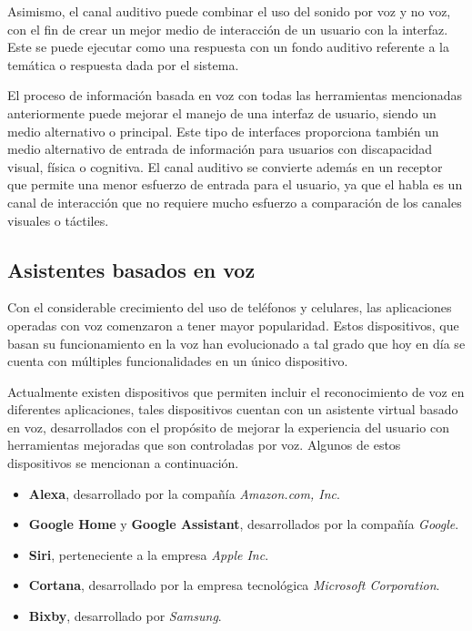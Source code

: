 Asimismo, el canal auditivo puede combinar el uso del sonido por voz y no voz, con el fin de crear un mejor medio de interacción de un usuario con la interfaz. Este se puede ejecutar como una respuesta con un fondo auditivo referente a la temática o respuesta dada por el sistema.

El proceso de información basada en voz con todas las herramientas mencionadas anteriormente puede mejorar el manejo de una interfaz de usuario, siendo un medio alternativo o principal. Este tipo de interfaces proporciona también un medio alternativo de entrada de información para usuarios con discapacidad visual, física o cognitiva. El canal auditivo se convierte además en un receptor que permite una menor esfuerzo de entrada para el usuario, ya que el habla es un canal de interacción que no requiere mucho esfuerzo a comparación de los canales visuales o táctiles.


\subsection{Asistentes basados en voz}
\label{AsistentesBasadosVozCap3}

Con el considerable crecimiento del uso de teléfonos y celulares, las aplicaciones operadas con voz comenzaron a tener mayor popularidad. Estos dispositivos, que basan su funcionamiento en la voz han evolucionado a tal grado que hoy en día se cuenta con múltiples funcionalidades en un único dispositivo.

Actualmente existen dispositivos que permiten incluir el reconocimiento de voz en diferentes aplicaciones, tales dispositivos cuentan con un asistente virtual basado en voz, desarrollados con el propósito de mejorar la experiencia del usuario con herramientas mejoradas que son controladas por voz. Algunos de estos dispositivos se mencionan a continuación.

\begin{itemize}
  \item \textbf{Alexa}, desarrollado por la compañía \textit{Amazon.com, Inc}.
  \item \textbf{Google Home} y \textbf{Google Assistant}, desarrollados por la compañía \textit{Google}.
  \item \textbf{Siri}, perteneciente a la empresa \textit{Apple Inc}.
  \item \textbf{Cortana}, desarrollado por la empresa tecnológica \textit{Microsoft Corporation}.
  \item \textbf{Bixby}, desarrollado por \textit{Samsung}.
\end{itemize}

